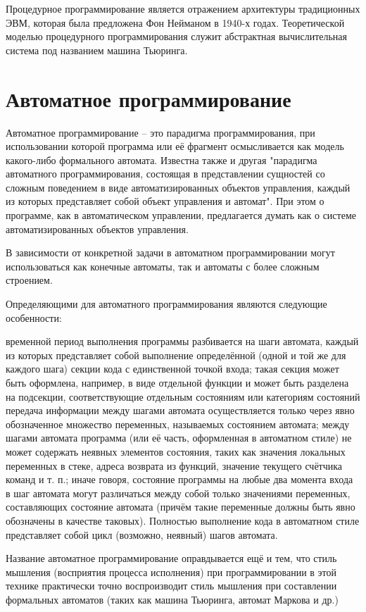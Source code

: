 \documentclass[12pt, twoside]{report}
\begin{document}
Процедурное программирование является отражением архитектуры традиционных ЭВМ, которая была предложена Фон Нейманом в 1940-х годах. Теоретической моделью процедурного программирования служит абстрактная вычислительная система под названием машина Тьюринга.

\section*{Автоматное программирование}

Автоматное программирование -- это парадигма программирования, при использовании которой программа или её фрагмент осмысливается как модель какого-либо формального автомата. Известна также и другая "парадигма автоматного программирования, состоящая в представлении сущностей со сложным поведением в виде автоматизированных объектов управления, каждый из которых представляет собой объект управления и автомат". При этом о программе, как в автоматическом управлении, предлагается думать как о системе автоматизированных объектов управления.

В зависимости от конкретной задачи в автоматном программировании могут использоваться как конечные автоматы, так и автоматы с более сложным строением.

Определяющими для автоматного программирования являются следующие особенности:

временной период выполнения программы разбивается на шаги автомата, каждый из которых представляет собой выполнение определённой (одной и той же для каждого шага) секции кода с единственной точкой входа; такая секция может быть оформлена, например, в виде отдельной функции и может быть разделена на подсекции, соответствующие отдельным состояниям или категориям состояний
передача информации между шагами автомата осуществляется только через явно обозначенное множество переменных, называемых состоянием автомата; между шагами автомата программа (или её часть, оформленная в автоматном стиле) не может содержать неявных элементов состояния, таких как значения локальных переменных в стеке, адреса возврата из функций, значение текущего счётчика команд и т. п.; иначе говоря, состояние программы на любые два момента входа в шаг автомата могут различаться между собой только значениями переменных, составляющих состояние автомата (причём такие переменные должны быть явно обозначены в качестве таковых).
Полностью выполнение кода в автоматном стиле представляет собой цикл (возможно, неявный) шагов автомата.

Название автоматное программирование оправдывается ещё и тем, что стиль мышления (восприятия процесса исполнения) при программировании в этой технике практически точно воспроизводит стиль мышления при составлении формальных автоматов (таких как машина Тьюринга, автомат Маркова и др.)
\end{document}
